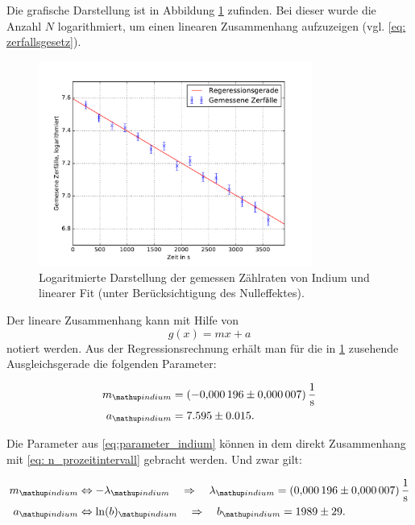 Die grafische Darstellung ist in Abbildung \ref{fig: plot_indium} zufinden. Bei dieser wurde
die Anzahl $N$ logarithmiert, um einen linearen Zusammenhang aufzuzeigen (vgl. \eqref{eq: zerfallsgesetz}).
\begin{figure}
  \centering
  \includegraphics[width=0.8\textwidth]{pics/logarithmiert_indium.pdf}
  \caption{Logaritmierte Darstellung der gemessen Zählraten von Indium und linearer Fit  (unter Berücksichtigung des Nulleffektes).}
  \label{fig: plot_indium}
\end{figure}

Der lineare Zusammenhang kann mit Hilfe von
\begin{equation*}
  g(x)=mx+a
\end{equation*}
notiert werden.
Aus der Regressionsrechnung erhält man für die in \ref{fig: plot_indium} zusehende
Ausgleichsgerade die folgenden Parameter:

\begin{align}
  \label{eq:parameter_indium}
  \begin{aligned}
    m\ua{indium}&=\SI{-0.000196\pm0.000007}{\per\second}\\
    a\ua{indium}&=7.595\pm0.015.
  \end{aligned}
\end{align}

Die Parameter aus \eqref{eq:parameter_indium} können in dem direkt Zusammenhang mit
\eqref{eq: n_prozeitintervall} gebracht werden. Und zwar gilt:

\begin{align}
  \label{eq:parameter_indium_vergleich}
  \begin{aligned}
    m\ua{indium}&\Leftrightarrow -\lambda\ua{indium} \quad \Rightarrow \quad \lambda\ua{indium}=\SI{0.000196\pm0.000007}{\per\second}\\
    a\ua{indium}&\Leftrightarrow \ln(b)\ua{indium} \quad \Rightarrow \quad b\ua{indium} =1989\pm 29.
  \end{aligned}
\end{align}

